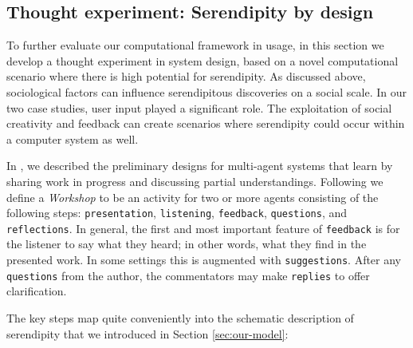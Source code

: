 \subsection{Thought experiment:  Serendipity by design} \label{sec:ww}

To further evaluate our computational framework in usage, in this
section we develop a thought experiment in system design, based on a
novel computational scenario where there is high potential for
serendipity.  As discussed above, sociological factors can influence
serendipitous discoveries on a social scale.  In our two case studies,
user input played a significant role.  The exploitation of social
creativity and feedback can create scenarios where serendipity could
occur within a computer system as well.

In \cite{corneli2015computational}, we described the preliminary designs for
multi-agent systems that learn by sharing work in progress and
discussing partial understandings.  
%
Following 
we define a \emph{Workshop} to be an activity for two or more agents
consisting of the following steps:
{\tt presentation}, {\tt listening}, {\tt feedback}, {\tt questions},
and {\tt reflections}.  In general, the first and most important
feature of {\tt feedback} is for the listener to say what they heard;
in other words, what they find in the presented work.  In some
settings this is augmented with {\tt suggestions}.  After any {\tt
  questions} from the author, the commentators may make {\tt replies}
to offer clarification.

The key steps map quite conveniently into the schematic description of serendipity that we introduced in Section \ref{sec:our-model}:


